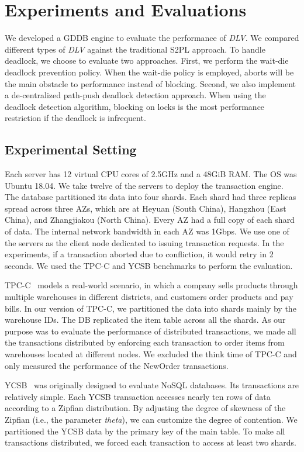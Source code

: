 \documentclass[conference]{IEEEtran}
\begin{document}
\section{Experiments and Evaluations}
\label{sec:experiments}
We developed a GDDB engine to evaluate the performance of \emph{DLV}.
We compared different types of \emph{DLV} against the traditional S2PL approach. 
To handle deadlock, we choose to evaluate two approaches.
First,  we perform the wait-die deadlock prevention policy.
When the wait-die policy is employed, aborts will be the main obstacle to performance instead of blocking. 
Second, we also implement a de-centralized path-push deadlock detection approach.
When using the deadlock detection algorithm,  blocking on locks is the most performance restriction if the deadlock is infrequent.

\subsection{Experimental Setting}
\label{subsec:exp_setting}
Each server has 12 virtual CPU cores of 2.5GHz and a 48GiB RAM. 
The OS was Ubuntu 18.04.
We take twelve of the servers to deploy the transaction engine.
The database partitioned its data into four shards. 
Each shard had three replicas spread across three AZs, 
which are at Heyuan (South China), Hangzhou (East China), and Zhangjiakou (North China).
Every AZ had a full copy of each shard of data.
The internal network bandwidth in each AZ was 1Gbps.
We use one of the servers as the client node dedicated to issuing transaction requests. 
In the experiments, if a transaction aborted due to confliction, it would retry in 2 seconds.
We used the TPC-C and YCSB benchmarks to perform the evaluation. 


TPC-C~\cite{TPCC:conf/tpctc/NambiarWMTLCM11} models a real-world scenario, in which a company sells products through multiple warehouses in different districts, and customers order products and pay bills.
In our version of TPC-C, we partitioned the data into shards mainly by the warehouse IDs.
The DB replicated the item table across all the shards.
As our purpose was to evaluate the performance of distributed transactions,
we made all the transactions distributed by enforcing each transaction to order items from warehouses located at different nodes.
We excluded the think time of TPC-C and only measured the performance of the NewOrder transactions.


YCSB~\cite{YCSB:conf/cloud/CooperSTRS10} was originally designed to evaluate NoSQL databases.
Its transactions are relatively simple.
Each YCSB transaction accesses nearly ten rows of data according to a Zipfian distribution.
By adjusting the degree of skewness of the Zipfian (i.e., the parameter \emph{theta}), we can customize the degree of contention.
We partitioned the YCSB data by the primary key of the main table.
To make all transactions distributed, we forced each transaction to access at least two shards.
\end{document}
